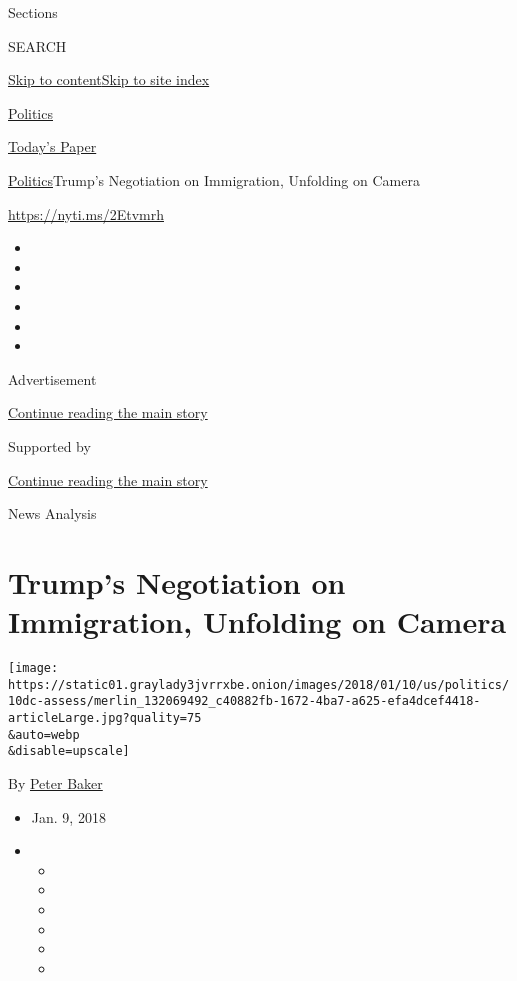 Sections

SEARCH

\protect\hyperlink{site-content}{Skip to
content}\protect\hyperlink{site-index}{Skip to site index}

\href{https://www.nytimes3xbfgragh.onion/section/politics}{Politics}

\href{https://myaccount.nytimes3xbfgragh.onion/auth/login?response_type=cookie\&client_id=vi}{}

\href{https://www.nytimes3xbfgragh.onion/section/todayspaper}{Today's
Paper}

\href{/section/politics}{Politics}\textbar{}Trump's Negotiation on
Immigration, Unfolding on Camera

\url{https://nyti.ms/2Etvmrh}

\begin{itemize}
\item
\item
\item
\item
\item
\item
\end{itemize}

Advertisement

\protect\hyperlink{after-top}{Continue reading the main story}

Supported by

\protect\hyperlink{after-sponsor}{Continue reading the main story}

News Analysis

\hypertarget{trumps-negotiation-on-immigration-unfolding-on-camera}{%
\section{Trump's Negotiation on Immigration, Unfolding on
Camera}\label{trumps-negotiation-on-immigration-unfolding-on-camera}}

\texttt{[image: https://static01.graylady3jvrrxbe.onion/images/2018/01/10/us/politics/10dc-assess/merlin\_132069492\_c40882fb-1672-4ba7-a625-efa4dcef4418-articleLarge.jpg?quality=75\\\&auto=webp\\\&disable=upscale]}

By \href{http://www.nytimes3xbfgragh.onion/by/peter-baker}{Peter Baker}

\begin{itemize}
\item
  Jan. 9, 2018
\item
  \begin{itemize}
  \item
  \item
  \item
  \item
  \item
  \item
  \end{itemize}
\end{itemize}


